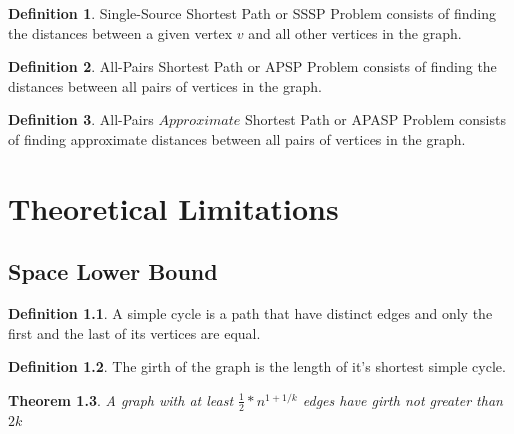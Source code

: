 \documentclass[shortabstract, lic, english]{iithesis}
\theoremstyle{definition} \newtheorem{definition}{Definition}[chapter]
\theoremstyle{remark} \newtheorem{remark}[definition]{Observation}
\theoremstyle{plain} \newtheorem{theorem}[definition]{Theorem}
\theoremstyle{plain} \newtheorem{lemma}[definition]{Lemma}
\theoremstyle{plain} \newtheorem{conjecture}[definition]{Conjecture}
\begin{document}
\begin{definition}
    Single-Source Shortest Path or SSSP Problem consists of finding the distances between a given vertex $v$ and all other vertices in the graph. 
\end{definition}

\begin{definition}
    All-Pairs Shortest Path or APSP Problem consists of finding the distances between all pairs of vertices in the graph. 
\end{definition}

\begin{definition}
    All-Pairs $Approximate$ Shortest Path or APASP Problem consists of finding approximate distances between all pairs of vertices in the graph. 
\end{definition}

\chapter{Theoretical Limitations} \label{theoreticalLimitations}

\section{Space Lower Bound}
\begin{definition}
    A simple cycle is a path that have distinct edges and only the first and the last of its vertices are equal.
\end{definition}

\begin{definition} 
    The girth of the graph is the length of it's shortest simple cycle. 
\end{definition}

\begin{theorem} \label{lotsOfEdgesLittleGirth}
    A graph with at least $\frac{1}{2} * n^{1 + 1/k}$ edges 
    have girth not greater than $2k$
\end{theorem}
\end{document}
